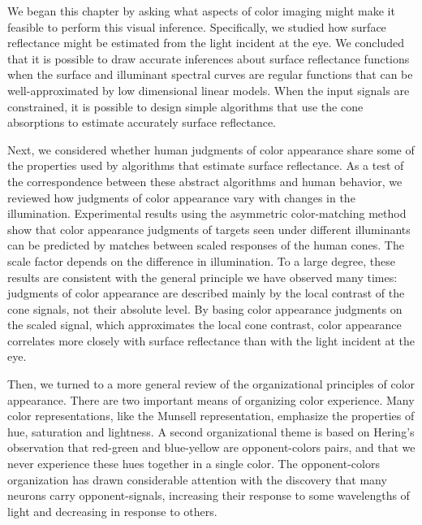 We began this chapter by asking what aspects of color imaging might
make it feasible to perform this visual inference.  Specifically, we
studied how surface reflectance might be estimated from the light
incident at the eye.  We concluded that it is possible to draw
accurate inferences about surface reflectance functions when the
surface and illuminant spectral curves are regular functions that can
be well-approximated by low dimensional linear models.  When the input
signals are constrained, it is possible to design simple algorithms
that use the cone absorptions to estimate accurately surface
reflectance.

Next, we considered whether human judgments of color appearance share
some of the properties used by algorithms that estimate surface
reflectance.  As a test of the correspondence between these abstract
algorithms and human behavior, we reviewed how judgments of color
appearance vary with changes in the illumination.  Experimental
results using the asymmetric color-matching method show that color
appearance judgments of targets seen under different illuminants can
be predicted by matches between scaled responses of the human cones.
The scale factor depends on the difference in illumination.  To a
large degree, these results are consistent with the general principle
we have observed many times: judgments of color appearance are
described mainly by the local contrast of the cone signals, not their
absolute level. By basing color appearance judgments on the scaled
signal, which approximates the local cone contrast, color appearance
correlates more closely with surface reflectance than with the light
incident at the eye.

Then, we turned to a more general review of the organizational
principles of color appearance.  There are two important means of
organizing color experience.  Many color representations, like the
Munsell representation, emphasize the properties of hue, saturation
and lightness.  A second organizational theme is based on Hering's
observation that red-green and blue-yellow are opponent-colors pairs,
and that we never experience these hues together in a single color.
The opponent-colors organization has drawn considerable attention with
the discovery that many neurons carry opponent-signals, increasing
their response to some wavelengths of light and decreasing in response
to others.

